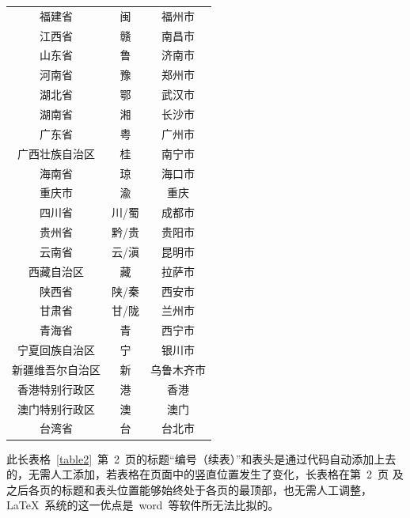 \begin{longtable}{ccc}
  福建省               & 闽    & 福州市                  \\
  江西省               & 赣    & 南昌市                  \\
  山东省               & 鲁    & 济南市                  \\
  河南省               & 豫    & 郑州市                  \\
  湖北省               & 鄂    & 武汉市                  \\
  湖南省               & 湘    & 长沙市                  \\
  广东省               & 粤    & 广州市                  \\
  广西壮族自治区       & 桂    & 南宁市                  \\
  海南省               & 琼    & 海口市                  \\
  重庆市               & 渝    & 重庆                    \\
  四川省               & 川/蜀 & 成都市                  \\
  贵州省               & 黔/贵 & 贵阳市                  \\
  云南省               & 云/滇 & 昆明市                  \\
  西藏自治区           & 藏    & 拉萨市                  \\
  陕西省               & 陕/秦 & 西安市                  \\
  甘肃省               & 甘/陇 & 兰州市                  \\
  青海省               & 青    & 西宁市                  \\
  宁夏回族自治区       & 宁    & 银川市                  \\
  新疆维吾尔自治区     & 新    & 乌鲁木齐市              \\
  香港特别行政区       & 港    & 香港                    \\
  澳门特别行政区       & 澳    & 澳门                    \\
  台湾省               & 台    & 台北市                  \\
\end{longtable}\normalsize
\vspace{-1em}

此长表格~\ref{table2}~第~2~页的标题“编号（续表）”和表头是通过代码自动添加上去的，无需人工添加，若表格在页面中的竖直位置发生了变化，长表格在第~2~页
及之后各页的标题和表头位置能够始终处于各页的最顶部，也无需人工调整，\LaTeX~系统的这一优点是~word~等软件所无法比拟的。

